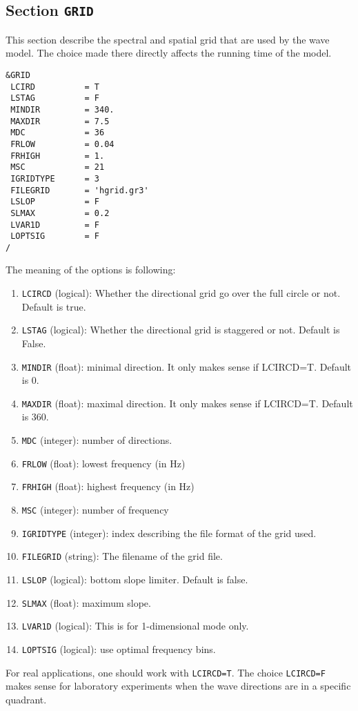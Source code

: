 \documentclass[12pt]{amsart}
\begin{document}
\subsection{Section {\tt GRID}}
This section describe the spectral and spatial grid that are used by the wave model.
The choice made there directly affects the running time of the model.

\begin{verbatim}
&GRID
 LCIRD          = T                 
 LSTAG          = F                 
 MINDIR         = 340.              
 MAXDIR         = 7.5               
 MDC            = 36                
 FRLOW          = 0.04              
 FRHIGH         = 1.                
 MSC            = 21                
 IGRIDTYPE      = 3                 
 FILEGRID       = 'hgrid.gr3'
 LSLOP          = F          
 SLMAX          = 0.2        
 LVAR1D         = F          
 LOPTSIG        = F          
/
\end{verbatim}
The meaning of the options is following:
\begin{enumerate}
\item {\tt LCIRCD} (logical): Whether the directional grid go over the full circle or not. Default is true.
\item {\tt LSTAG} (logical): Whether the directional grid is staggered or not. Default is False.
\item {\tt MINDIR} (float): minimal direction. It only makes sense if LCIRCD=T. Default is 0.
\item {\tt MAXDIR} (float): maximal direction. It only makes sense if LCIRCD=T. Default is 360.
\item {\tt MDC} (integer): number of directions.
\item {\tt FRLOW} (float): lowest frequency (in Hz)
\item {\tt FRHIGH} (float): highest frequency (in Hz)
\item {\tt MSC} (integer): number of frequency
\item {\tt IGRIDTYPE} (integer): index describing the file format of the grid used.
\item {\tt FILEGRID} (string): The filename of the grid file.
\item {\tt LSLOP} (logical): bottom slope limiter. Default is false.
\item {\tt SLMAX} (float): maximum slope.
\item {\tt LVAR1D} (logical): This is for 1-dimensional mode only.
\item {\tt LOPTSIG} (logical): use optimal frequency bins.
\end{enumerate}
For real applications, one should work with {\tt LCIRCD=T}. The choice {\tt LCIRCD=F} makes sense for laboratory experiments when the wave directions are in a specific quadrant.
\end{document}
